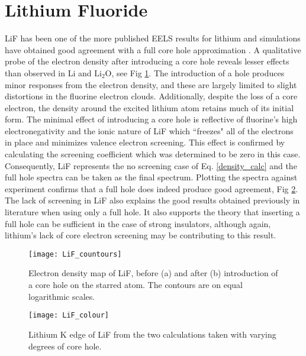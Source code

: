 \section{Lithium Fluoride}
LiF has been one of the more published EELS results for lithium and simulations have obtained good agreement with a full core hole approximation \cite{gao_theory_2008, mauchamp_ab_2006}.  A qualitative probe of the electron density after introducing a core hole reveals lesser effects than observed in Li and $ \mathrm{Li_2O} $, see Fig \ref{LiF_countours}.  The introduction of a hole produces minor responses from the electron density, and these are largely limited to slight distortions in the fluorine electron clouds. Additionally, despite the loss of a core electron, the density around the excited lithium atom retains much of its initial form. The minimal effect of introducing a core hole is reflective of fluorine's high electronegativity and the ionic nature of LiF which ``freezes" all of the electrons in place and minimizes valence electron screening.  This effect is confirmed by calculating the screening coefficient which was determined to be zero in this case. Consequently, LiF represents the no screening case of Eq. \ref{density_calc} and the full hole spectra can be taken as the final spectrum.  Plotting the spectra against experiment confirms that a full hole does indeed produce good agreement, Fig \ref{LiF_spectra}.  The lack of screening in LiF also explains the good results obtained previously in literature when using only a full hole.  It also supports the theory that inserting a full hole can be sufficient in the case of strong insulators, although again, lithium's lack of core electron screening may be contributing to this result.

\begin{figure}
	\centering
	\texttt{[image: LiF\_countours]}
	\caption{Electron density map of LiF, before (a) and after (b) introduction of a core hole on the starred atom.  The contours are on equal logarithmic scales.}
	\label{LiF_countours}
\end{figure}

\begin{figure}
	\centering
	\texttt{[image: LiF\_colour]}
	\caption{Lithium K edge of LiF from the two calculations taken with varying degrees of core hole. }
	\label{LiF_spectra}
\end{figure}



